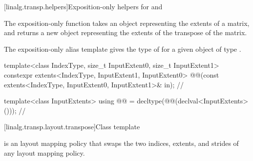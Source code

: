 [linalg.transp.helpers]{Exposition-only helpers for  and }

\pnum
The exposition-only  function
takes an  object representing the extents of a matrix,
and returns a new  object
representing the extents of the transpose of the matrix.

\pnum
The exposition-only alias template
gives the type of 
for a given  object  of type .
\begin{itemdecl}
template<class IndexType, size_t InputExtent0, size_t InputExtent1>
  constexpr extents<IndexType, InputExtent1, InputExtent0>
    @@(const extents<IndexType, InputExtent0, InputExtent1>& in);   // \expos
\end{itemdecl}

\begin{itemdescr}
\pnum
\returns
{}
\end{itemdescr}

\begin{codeblock}
template<class InputExtents>
  using @@ =
    decltype(@@(declval<InputExtents>()));        // \expos
\end{codeblock}

[linalg.transp.layout.transpose]{Class template }

\pnum
{} is an  layout mapping policy
that swaps the two indices, extents, and strides
of any  layout mapping policy.

